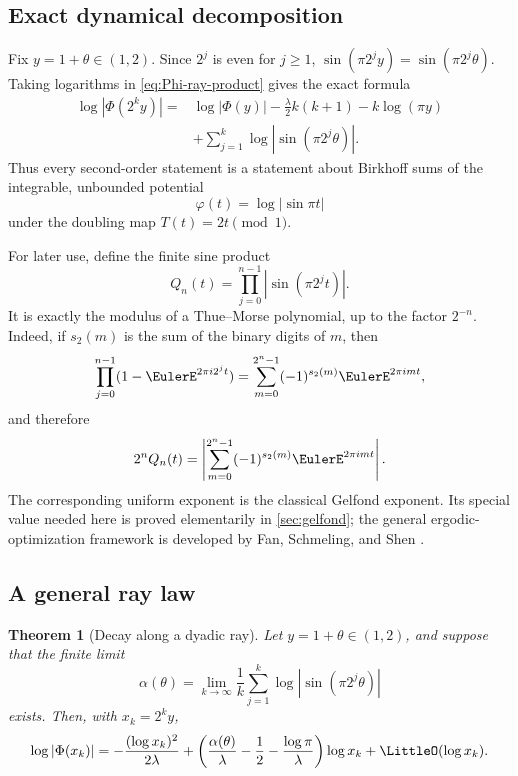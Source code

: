 \documentclass[11pt,oneside]{article}
\newtheorem{theorem}{Theorem}[section]
\theoremstyle{definition}
\theoremstyle{remark}
\newcommand{\PhiF}{\Phi}
\begin{document}
\subsection{Exact dynamical decomposition}

Fix \(y=1+\theta\in(1,2)\).  Since \(2^j\) is even for \(j\ge1\),
\(
 \sin(\pi2^j y)=\sin(\pi2^j\theta).
\)
Taking logarithms in \eqref{eq:Phi-ray-product} gives the exact formula
\begin{equation}
\begin{split}
 \log|\PhiF(2^k y)|
 ={}&\log|\PhiF(y)|
 -\frac{\lambda}{2}k(k+1)
 -k\log(\pi y)\\
 &+\sum_{j=1}^{k}\log|\sin(\pi2^j\theta)|.
\end{split}
\label{eq:ray-log-exact}
\end{equation}
Thus every second-order statement is a statement about Birkhoff sums of the
integrable, unbounded potential
\begin{equation}
 \varphi(t)=\log|\sin\pi t|
 \label{eq:potential}
\end{equation}
under the doubling map \(T(t)=2t\pmod1\).

For later use, define the finite sine product
\begin{equation}
 Q_n(t)=\prod_{j=0}^{n-1}|\sin(\pi2^j t)|.
 \label{eq:Qn-definition}
\end{equation}
It is exactly the modulus of a Thue--Morse polynomial, up to the factor
\(2^{-n}\).  Indeed, if \(s_2(m)\) is the sum of the binary digits of \(m\),
then
\begin{equation}
 \prod_{j=0}^{n-1}(1-\EulerE^{2\pi i2^j t})
 =\sum_{m=0}^{2^n-1}(-1)^{s_2(m)}\EulerE^{2\pi i m t},
 \label{eq:TM-polynomial}
\end{equation}
and therefore
\begin{equation}
 2^nQ_n(t)=
 \left|\sum_{m=0}^{2^n-1}(-1)^{s_2(m)}\EulerE^{2\pi i m t}\right|.
 \label{eq:Q-TM-modulus}
\end{equation}
The corresponding uniform exponent is the classical Gelfond exponent.  Its
special value needed here is proved elementarily in \cref{sec:gelfond}; the
general ergodic-optimization framework is developed by Fan, Schmeling, and
Shen \cite{fan2021}.

\subsection{A general ray law}

\begin{theorem}[Decay along a dyadic ray]
\label{thm:general-ray}
Let \(y=1+\theta\in(1,2)\), and suppose that the finite limit
\begin{equation}
 \alpha(\theta)=
 \lim_{k\to\infty}\frac1k
 \sum_{j=1}^{k}\log|\sin(\pi2^j\theta)|
 \label{eq:alpha-definition}
\end{equation}
exists.  Then, with \(x_k=2^k y\),
\begin{equation}
 \log|\PhiF(x_k)|
 =-\frac{(\log x_k)^2}{2\lambda}
 +\left(
   \frac{\alpha(\theta)}{\lambda}
   -\frac12-\frac{\log\pi}{\lambda}
  \right)\log x_k
 +\LittleO(\log x_k).
 \label{eq:general-ray-asymptotic}
\end{equation}
\end{theorem}
\end{document}
